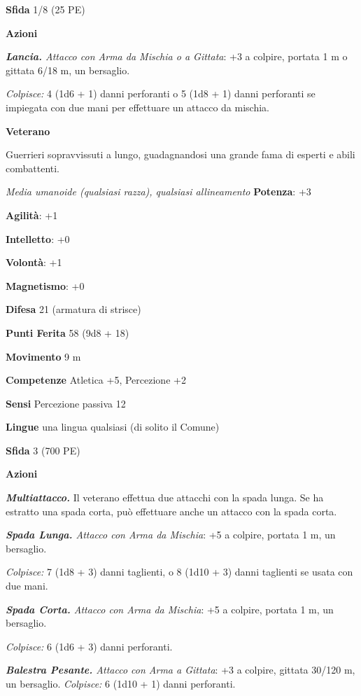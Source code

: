 \begin{multicols}{2}
\textbf{Sfida} 1/8 (25 PE)\smallskip

\smallskip\textbf{Azioni}

\emph{\textbf{Lancia.} Attacco con Arma da Mischia o a Gittata}: +3 a
colpire, portata 1 m o gittata 6/18 m, un bersaglio.

\emph{Colpisce:} 4 (1d6 + 1) danni perforanti o 5 (1d8 + 1) danni
perforanti se impiegata con due mani per effettuare un attacco da
mischia.

\textbf{Veterano}

Guerrieri sopravvissuti a lungo, guadagnandosi una grande fama di
esperti e abili combattenti.

\emph{Media umanoide (qualsiasi razza), qualsiasi allineamento}
\textbf{Potenza}: +3

\textbf{Agilità}: +1

\textbf{Intelletto}: +0

\textbf{Volontà}: +1

\textbf{Magnetismo}: +0

\textbf{Difesa} 21 (armatura di strisce)

\textbf{Punti Ferita} 58 (9d8 + 18)

\textbf{Movimento} 9 m

\textbf{Competenze} Atletica +5, Percezione +2

\textbf{Sensi} Percezione passiva 12

\textbf{Lingue} una lingua qualsiasi (di solito il Comune)

\textbf{Sfida} 3 (700 PE)\smallskip

\smallskip\textbf{Azioni}

\emph{\textbf{Multiattacco.}} Il veterano effettua due attacchi con la
spada lunga. Se ha estratto una spada corta, può effettuare anche un
attacco con la spada corta.

\emph{\textbf{Spada Lunga.} Attacco con Arma da Mischia}: +5 a colpire,
portata 1 m, un bersaglio.

\emph{Colpisce:} 7 (1d8 + 3) danni taglienti, o 8 (1d10 + 3) danni
taglienti se usata con due mani.

\emph{\textbf{Spada Corta.} Attacco con Arma da Mischia}: +5 a colpire,
portata 1 m, un bersaglio.

\emph{Colpisce:} 6 (1d6 + 3) danni perforanti.

\emph{\textbf{Balestra Pesante.} Attacco con Arma a Gittata}: +3 a
colpire, gittata 30/120 m, un bersaglio. \emph{Colpisce:} 6 (1d10 + 1)
danni perforanti.


\end{multicols}
